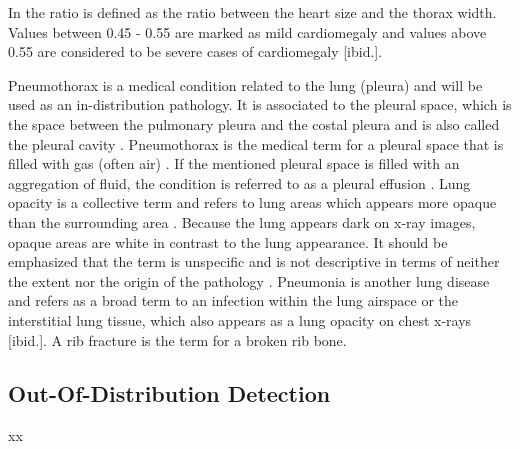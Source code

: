In \citep{Dahnert2011} the ratio is defined as the ratio between the heart size and the thorax width. 
Values between 0.45 - 0.55 are marked as mild cardiomegaly and values above 0.55 are considered to be severe cases of cardiomegaly [ibid.].
\par 
Pneumothorax is a medical condition related to the lung (pleura) and will be used as an in-distribution pathology.
It is associated to the pleural space, which is the space between the pulmonary pleura and the costal pleura and is also called the pleural cavity \citep{Charalampidis2015}.
Pneumothorax is the medical term for a pleural space that is filled with gas (often air) \citep{Dahnert2011,Hansell2008}.
If the mentioned pleural space is filled with an aggregation of fluid, the condition is referred to as a pleural effusion \citep{Karkhanis2012}.
Lung opacity is a collective term and refers to lung areas which appears more opaque than the surrounding area \citep{Hansell2008}.
Because the lung appears dark on x-ray images, opaque areas are white in contrast to the lung appearance.
It should be emphasized that the term is unspecific and is not descriptive in terms of neither the extent nor the origin of the pathology \citep{Hansell2008}.
Pneumonia is another lung disease and refers as a broad term to an infection within the lung airspace or the interstitial lung tissue, which also appears as a lung opacity on chest x-rays [ibid.].
A rib fracture is the term for a broken rib bone.
\subsection{Out-Of-Distribution Detection}
xx
